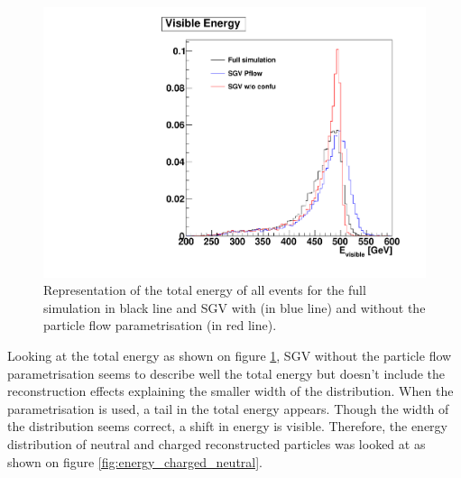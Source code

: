 \begin{figure}[htbp!]
  \centering
  \includegraphics[width=1\linewidth]{Appendixes/fig_SGV/Evis.pdf}
  \caption{Representation of the total energy of all events for the full simulation in black line and SGV with (in blue line) and without the particle flow parametrisation (in red line).}
  \label{fig:energy_total}
\end{figure}

Looking at the total energy as shown on figure \ref{fig:energy_total}, SGV without the particle flow parametrisation seems to describe well the total energy but doesn't include the reconstruction effects explaining the smaller width of the distribution. When the parametrisation is used, a tail in the total energy appears. Though the width of the distribution seems correct, a shift in energy is visible. Therefore, the energy distribution of neutral and charged reconstructed particles was looked at as shown on figure \ref{fig:energy_charged_neutral}.

